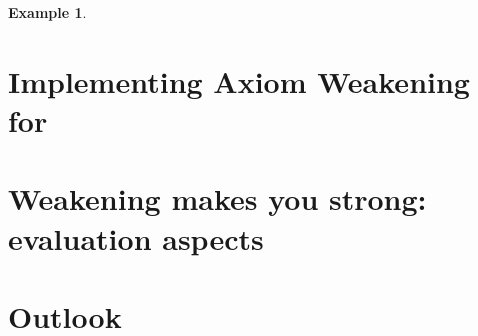 \documentclass[
]{ceurart}
\newtheorem{example}{Example}
\begin{document}

\begin{example}
\end{example}


\section{Implementing Axiom Weakening for \SROIQ}


\section{Weakening makes you strong: evaluation aspects}


\section{Outlook}




\appendix
\end{document}
